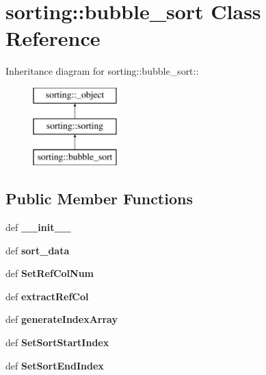 \hypertarget{classsorting_1_1bubble__sort}{
\section{sorting::bubble\_\-sort Class Reference}
\label{dc/ddd/classsorting_1_1bubble__sort}
}
Inheritance diagram for sorting::bubble\_\-sort::\begin{figure}[H]
\begin{center}
\leavevmode
\includegraphics[height=3cm]{dc/ddd/classsorting_1_1bubble__sort}
\end{center}
\end{figure}
\subsection*{Public Member Functions}
\begin{DoxyCompactItemize}
\item 
\hypertarget{classsorting_1_1bubble__sort_a41429408d3f230ce2b68acaeacabe719}{
def {\bfseries \_\-\_\-init\_\-\_\-}}
\label{dc/ddd/classsorting_1_1bubble__sort_a41429408d3f230ce2b68acaeacabe719}

\item 
\hypertarget{classsorting_1_1bubble__sort_a25f3566a6fe7dac1291ae1ca3b190f6d}{
def {\bfseries sort\_\-data}}
\label{dc/ddd/classsorting_1_1bubble__sort_a25f3566a6fe7dac1291ae1ca3b190f6d}

\item 
\hypertarget{classsorting_1_1bubble__sort_aa4d91cd959905d26975604a165687d6e}{
def {\bfseries SetRefColNum}}
\label{dc/ddd/classsorting_1_1bubble__sort_aa4d91cd959905d26975604a165687d6e}

\item 
\hypertarget{classsorting_1_1bubble__sort_a10ece0df6466a21213006beea777f3d9}{
def {\bfseries extractRefCol}}
\label{dc/ddd/classsorting_1_1bubble__sort_a10ece0df6466a21213006beea777f3d9}

\item 
\hypertarget{classsorting_1_1bubble__sort_aa5818ee4017096a296d6943054f4831a}{
def {\bfseries generateIndexArray}}
\label{dc/ddd/classsorting_1_1bubble__sort_aa5818ee4017096a296d6943054f4831a}

\item 
\hypertarget{classsorting_1_1bubble__sort_afbc885145ee1afd6eec22814143ea480}{
def {\bfseries SetSortStartIndex}}
\label{dc/ddd/classsorting_1_1bubble__sort_afbc885145ee1afd6eec22814143ea480}

\item 
\hypertarget{classsorting_1_1bubble__sort_aa1c565331e9ca1c884fd86b7e94ca253}{
def {\bfseries SetSortEndIndex}}
\label{dc/ddd/classsorting_1_1bubble__sort_aa1c565331e9ca1c884fd86b7e94ca253}

\end{DoxyCompactItemize}
